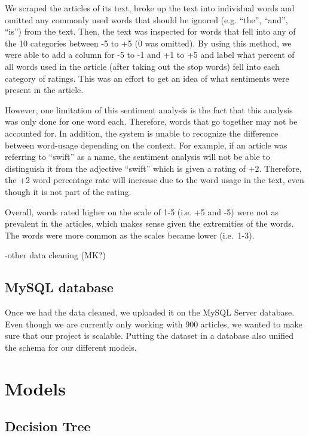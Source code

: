 \documentclass[10pt,letterpaper]{article}
\begin{document}
We scraped the articles of its text, broke up the text into individual
words and omitted any commonly used words that should be ignored (e.g.
``the'', ``and'', ``is'') from the text. Then, the text was inspected
for words that fell into any of the 10 categories between -5 to +5 (0
was omitted). By using this method, we were able to add a column for -5
to -1 and +1 to +5 and label what percent of all words used in the
article (after taking out the stop words) fell into each category of
ratings. This was an effort to get an idea of what sentiments were
present in the article.

However, one limitation of this sentiment analysis is the fact that this
analysis was only done for one word each. Therefore, words that go
together may not be accounted for. In addition, the system is unable to
recognize the difference between word-usage depending on the context.
For example, if an article was referring to ``swift'' as a name, the
sentiment analysis will not be able to distinguish it from the adjective
``swift'' which is given a rating of +2. Therefore, the +2 word
percentage rate will increase due to the word usage in the text, even
though it is not part of the rating.

Overall, words rated higher on the scale of 1-5 (i.e. +5 and -5) were
not as prevalent in the articles, which makes sense given the
extremities of the words. The words were more common as the scales
became lower (i.e.~1-3).

-other data cleaning (MK?)

\subsection{MySQL database}\label{mysql-database}

Once we had the data cleaned, we uploaded it on the MySQL Server
database. Even though we are currently only working with 900 articles,
we wanted to make sure that our project is scalable. Putting the dataset
in a database also unified the schema for our different models.

\section{Models}\label{models}

\subsection{Decision Tree}\label{decision-tree}
\end{document}
